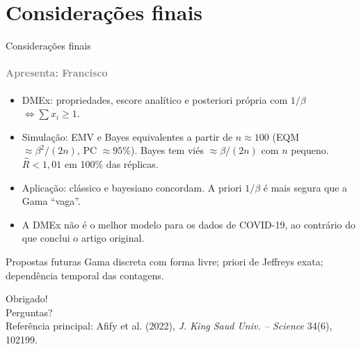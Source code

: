 \documentclass[10pt,aspectratio=169]{beamer}
\newcommand{\por}[1]{\framesubtitle{\textcolor{gray}{Apresenta: #1}}}
\begin{document}
\section{Considerações finais}
\begin{frame}{Considerações finais}
\por{Francisco}
\begin{itemize}
\item DMEx: propriedades, escore analítico e posteriori própria com $1/\beta$ $\iff\sum x_i\ge1$.
\item Simulação: EMV e Bayes equivalentes a partir de $n\approx100$ (EQM $\approx\beta^2/(2n)$, PC $\approx95\%$). Bayes tem viés $\approx\beta/(2n)$ com $n$ pequeno. $\hat R<1{,}01$ em 100\% das réplicas.
\item Aplicação: clássico e bayesiano concordam. A priori $1/\beta$ é mais segura que a Gama ``vaga''.
\item A DMEx não é o melhor modelo para os dados de COVID-19, ao contrário do que conclui o artigo original.
\end{itemize}
\begin{block}{Propostas futuras}
Gama discreta com forma livre; priori de Jeffreys exata; dependência temporal das contagens.
\end{block}
\end{frame}

\begin{frame}
\centering\Large Obrigado!\\[0.5cm]
\normalsize Perguntas?\\[0.8cm]
\footnotesize Referência principal: Afify et al. (2022), \emph{J. King Saud Univ. -- Science} 34(6), 102199.
\end{frame}
\end{document}
